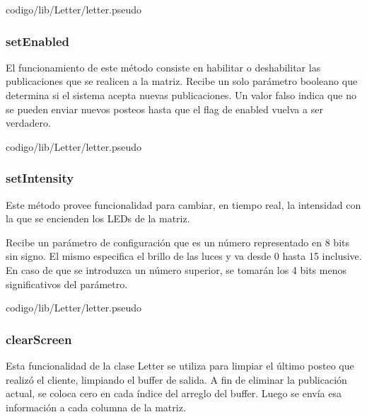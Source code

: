         
                     {codigo/lib/Letter/letter.pseudo}
                     
        
        \subsubsection{setEnabled}
        El funcionamiento de este método consiste en habilitar o deshabilitar las publicaciones que se realicen a la matriz. Recibe un solo parámetro booleano que determina si el sistema acepta nuevas publicaciones. Un valor falso indica que no se pueden enviar nuevos posteos hasta que el flag de enabled vuelva a ser verdadero.
        
        
                     {codigo/lib/Letter/letter.pseudo}
        
        
        \subsubsection{setIntensity}
        Este método provee funcionalidad para cambiar, en tiempo real, la intensidad con la que se encienden los LEDs de la matriz. 
        
        Recibe un parámetro de configuración que es un número representado en 8 bits sin signo. El mismo especifica el brillo de las luces y va desde 0 hasta 15 inclusive. En caso de que se introduzca un número superior, se tomarán los 4 bits menos significativos del parámetro.
        
        
                     {codigo/lib/Letter/letter.pseudo}
                     
        
        \subsubsection{clearScreen}
        Esta funcionalidad de la clase Letter se utiliza para limpiar el último posteo que realizó el cliente, limpiando el buffer de salida. A fin de eliminar la publicación actual, se coloca cero en cada índice del arreglo del buffer. Luego se envía esa información a cada columna de la matriz.
        
